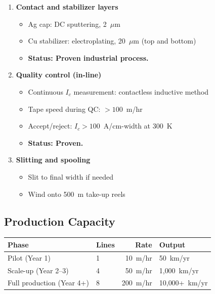 \documentclass[11pt, a4paper]{article}
\begin{document}
\begin{enumerate}
  \item \textbf{Contact and stabilizer layers}
    \begin{itemize}[nosep]
      \item Ag cap: DC sputtering, 2~$\mu$m
      \item Cu stabilizer: electroplating, 20~$\mu$m (top and bottom)
      \item \textcolor{nm-green}{\textbf{Status: Proven industrial
            process.}}
    \end{itemize}

  \item \textbf{Quality control (in-line)}
    \begin{itemize}[nosep]
      \item Continuous $I_c$ measurement: contactless inductive method
      \item Tape speed during QC: $> 100$~m/hr
      \item Accept/reject: $I_c > 100$~A/cm-width at 300~K
      \item \textcolor{nm-green}{\textbf{Status: Proven.}}
    \end{itemize}

  \item \textbf{Slitting and spooling}
    \begin{itemize}[nosep]
      \item Slit to final width if needed
      \item Wind onto 500~m take-up reels
    \end{itemize}
\end{enumerate}

\subsection{Production Capacity}

\begin{center}
\begin{tabular}{@{}llrl@{}}
\toprule
\textbf{Phase} & \textbf{Lines} & \textbf{Rate} & \textbf{Output} \\
\midrule
Pilot (Year 1) & 1 & 10~m/hr & 50~km/yr \\
Scale-up (Year 2--3) & 4 & 50~m/hr & 1{,}000~km/yr \\
Full production (Year 4+) & 8 & 200~m/hr & 10{,}000+~km/yr \\
\bottomrule
\end{tabular}
\end{center}
\end{document}
